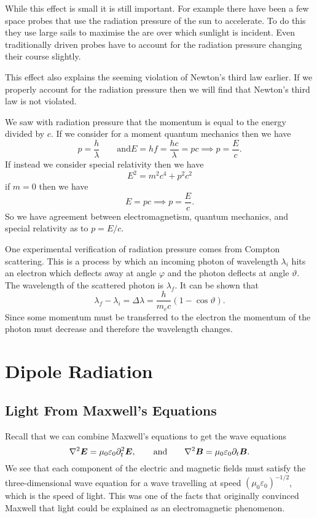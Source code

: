     While this effect is small it is still important.
    For example there have been a few space probes that use the radiation pressure of the sun to accelerate.
    To do this they use large sails to maximise the are over which sunlight is incident.
    Even traditionally driven probes have to account for the radiation pressure changing their course slightly.
    
    This effect also explains the seeming violation of Newton's third law earlier.
    If we properly account for the radiation pressure then we will find that Newton's third law is not violated.
    
    We saw with radiation pressure that the momentum is equal to the energy divided by \(c\).
    If we consider for a moment quantum mechanics then we have
    \[p = \frac{h}{\lambda}\qquad \text{and} E = hf = \frac{hc}{\lambda} = pc \implies p = \frac{E}{c}.\]
    If instead we consider special relativity then we have
    \[E^2 = m^2c^4 + p^2c^2\]
    if \(m = 0\) then we have
    \[E = pc \implies p = \frac{E}{c}.\]
    So we have agreement between electromagnetism, quantum mechanics, and special relativity as to \(p = E/c\).
    
    One experimental verification of radiation pressure comes from Compton scattering.
    This is a process by which an incoming photon of wavelength \(\lambda_i\) hits an electron which deflects away at angle \(\varphi\) and the photon deflects at angle \(\vartheta\).
    The wavelength of the scattered photon is \(\lambda_f\).
    It can be shown that
    \[\lambda_f - \lambda_i = \Delta \lambda = \frac{h}{m_ec}(1 - \cos\vartheta).\]
    Since some momentum must be transferred to the electron the momentum of the photon must decrease and therefore the wavelength changes.
    
    \section{Dipole Radiation}
    \subsection{Light From Maxwell's Equations}
    Recall that we can combine Maxwell's equations to get the wave equations
    \[\nabla^2\bm{E} = \mu_0\varepsilon_0 \partial_t^2\bm{E}, \qquad\text{and}\qquad \nabla^2\bm{B} = \mu_0\varepsilon_0\partial_t\bm{B}.\]
    We see that each component of the electric and magnetic fields must satisfy the three-dimensional wave equation for a wave travelling at speed \((\mu_0\varepsilon_0)^{-1/2}\), which is the speed of light.
    This was one of the facts that originally convinced Maxwell that light could be explained as an electromagnetic phenomenon.
    
